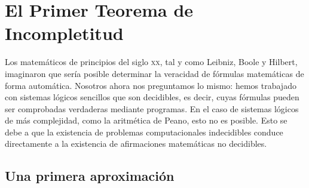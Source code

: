 

\chapter{El Primer Teorema de Incompletitud}\label{ch:teorema-incompletitud}

Los matemáticos de principios del siglo \textsc{xx}, tal y como Leibniz, Boole y Hilbert, imaginaron que sería posible determinar la veracidad de fórmulas matemáticas de forma automática. Nosotros ahora nos preguntamos lo mismo: hemos trabajado con sistemas lógicos sencillos que son decidibles, es decir, cuyas fórmulas pueden ser comprobadas verdaderas mediante programas. En el caso de sistemas lógicos de más complejidad, como la aritmética de Peano, esto no es posible. Esto se debe a que la existencia de problemas computacionales indecidibles conduce directamente a la existencia de afirmaciones matemáticas no decidibles.


\section{Una primera aproximación}\label{sec:primera-aproximacion}


